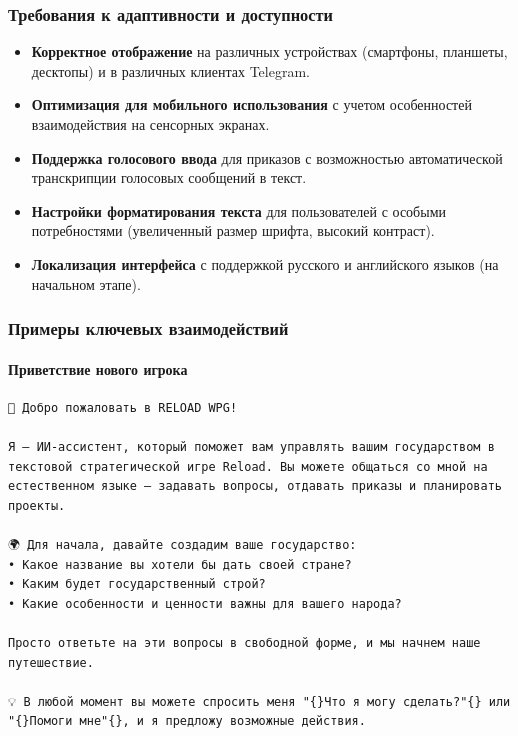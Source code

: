 \subsubsection{Требования к адаптивности и доступности}

\begin{itemize}
    \item \textbf{Корректное отображение} на различных устройствах (смартфоны, планшеты, десктопы) и в различных клиентах Telegram.

    \item \textbf{Оптимизация для мобильного использования} с учетом особенностей взаимодействия на сенсорных экранах.

    \item \textbf{Поддержка голосового ввода} для приказов с возможностью автоматической транскрипции голосовых сообщений в текст.

    \item \textbf{Настройки форматирования текста} для пользователей с особыми потребностями (увеличенный размер шрифта, высокий контраст).

    \item \textbf{Локализация интерфейса} с поддержкой русского и английского языков (на начальном этапе).
\end{itemize}

\subsubsection{Примеры ключевых взаимодействий}

\paragraph{Приветствие нового игрока}

\begin{verbatim}
👋 Добро пожаловать в RELOAD WPG!

Я — ИИ-ассистент, который поможет вам управлять вашим государством в
текстовой стратегической игре Reload. Вы можете общаться со мной на
естественном языке — задавать вопросы, отдавать приказы и планировать проекты.

🌍 Для начала, давайте создадим ваше государство:
• Какое название вы хотели бы дать своей стране?
• Каким будет государственный строй?
• Какие особенности и ценности важны для вашего народа?

Просто ответьте на эти вопросы в свободной форме, и мы начнем наше путешествие.

💡 В любой момент вы можете спросить меня "{}Что я могу сделать?"{} или
"{}Помоги мне"{}, и я предложу возможные действия.
\end{verbatim}

